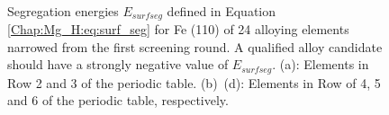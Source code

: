 \newpage
\begingroup
\begin{figure}[!ht]
  \centering
  \label{Chap:Mg_H:fig:7a}
  \label{Chap:Mg_H:fig:7b}
  \\
  \label{Chap:Mg_H:fig:7c}
  \label{Chap:Mg_H:fig:7d}
\caption[Surface segregation energies for Fe (110) of 24 alloying elements]{Segregation energies $E_{surf seg}$ defined in Equation \ref{Chap:Mg_H:eq:surf_seg} for Fe (110) of 24 alloying elements narrowed from the first screening round. A qualified alloy candidate should have a strongly negative value of $E_{surf seg}$. (a): Elements in Row 2 and 3 of the periodic table. (b)~(d): Elements in Row of 4, 5 and 6 of the periodic table, respectively.}
  \label{Chap:Mg_H:fig7}
\end{figure}
\endgroup

